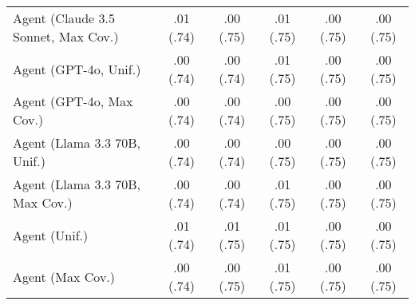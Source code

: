 \begin{table}[h!]
\begin{tabular}{lccccc}
    Agent (Claude 3.5 Sonnet, Max Cov.) & \cellcolor{bronze!30}.01 {\small (.74)} & \cellcolor{bronze!30}.00 {\small (.75)} & .01 {\small (.75)} & .00 {\small (.75)} & \cellcolor{bronze!30}.00 {\small (.75)} \\
    Agent (GPT-4o, Unif.) & .00 {\small (.74)} & .00 {\small (.74)} & .01 {\small (.75)} & \cellcolor{bronze!30}.00 {\small (.75)} & \cellcolor{bronze!30}.00 {\small (.75)} \\
    Agent (GPT-4o, Max Cov.) & .00 {\small (.74)} & .00 {\small (.74)} & .00 {\small (.75)} & .00 {\small (.75)} & \cellcolor{bronze!30}.00 {\small (.75)} \\
    Agent (Llama 3.3 70B, Unif.) & .00 {\small (.74)} & .00 {\small (.74)} & .00 {\small (.75)} & .00 {\small (.75)} & .00 {\small (.75)} \\
    Agent (Llama 3.3 70B, Max Cov.) & .00 {\small (.74)} & .00 {\small (.74)} & .01 {\small (.75)} & \cellcolor{bronze!30}.00 {\small (.75)} & \cellcolor{silver!30}.00 {\small (.75)} \\
    Agent (Unif.) & \cellcolor{silver!30}.01 {\small (.74)} & \cellcolor{silver!30}.01 {\small (.75)} & \cellcolor{silver!30}.01 {\small (.75)} & \cellcolor{silver!30}.00 {\small (.75)} & \cellcolor{silver!30}.00 {\small (.75)} \\
    Agent (Max Cov.) & .00 {\small (.74)} & \cellcolor{bronze!30}.00 {\small (.75)} & .01 {\small (.75)} & \cellcolor{bronze!30}.00 {\small (.75)} & \cellcolor{silver!30}.00 {\small (.75)} \\
    \bottomrule
    \end{tabular}
\end{table}